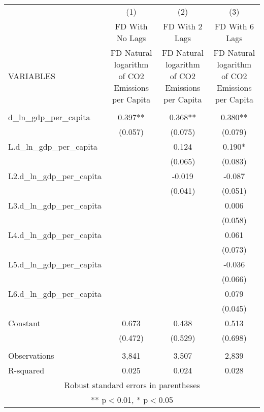\begin{tabular}{lccc} \hline
 & (1) & (2) & (3) \\
 & FD With No Lags & FD With 2 Lags & FD With 6 Lags \\
VARIABLES & FD Natural logarithm of CO2 Emissions per Capita & FD Natural logarithm of CO2 Emissions per Capita & FD Natural logarithm of CO2 Emissions per Capita \\ \hline
 &  &  &  \\
d\_ln\_gdp\_per\_capita & 0.397** & 0.368** & 0.380** \\
 & (0.057) & (0.075) & (0.079) \\
L.d\_ln\_gdp\_per\_capita &  & 0.124 & 0.190* \\
 &  & (0.065) & (0.083) \\
L2.d\_ln\_gdp\_per\_capita &  & -0.019 & -0.087 \\
 &  & (0.041) & (0.051) \\
L3.d\_ln\_gdp\_per\_capita &  &  & 0.006 \\
 &  &  & (0.058) \\
L4.d\_ln\_gdp\_per\_capita &  &  & 0.061 \\
 &  &  & (0.073) \\
L5.d\_ln\_gdp\_per\_capita &  &  & -0.036 \\
 &  &  & (0.066) \\
L6.d\_ln\_gdp\_per\_capita &  &  & 0.079 \\
 &  &  & (0.045) \\
Constant & 0.673 & 0.438 & 0.513 \\
 & (0.472) & (0.529) & (0.698) \\
 &  &  &  \\
Observations & 3,841 & 3,507 & 2,839 \\
 R-squared & 0.025 & 0.024 & 0.028 \\ \hline
\multicolumn{4}{c}{ Robust standard errors in parentheses} \\
\multicolumn{4}{c}{ ** p$<$0.01, * p$<$0.05} \\
\end{tabular}
